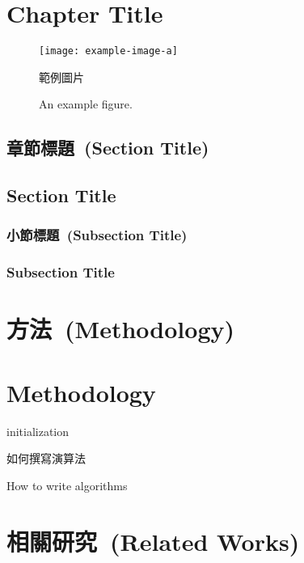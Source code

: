 \documentclass[master]{NTHUthesis}
\begin{document}
    \chapter{Chapter Title}
    \lipsum[1-3]
\fi

\begin{figure}
    \centering
    \texttt{[image: example-image-a]}
    \ifdefined \zhmode
        \caption{範例圖片}
    \else
        \caption{An example figure.}
    \fi
    \label{fig:example-a}
\end{figure}

\ifdefined \zhmode
    \section{章節標題~(Section Title)}
    \zhlipsum[4-5]
\else
    \section{Section Title}
    \lipsum[4-5]
\fi

\ifdefined \zhmode
    \subsection{小節標題~(Subsection Title)}
    \zhlipsum[6]
\else
    \subsection{Subsection Title}
    \lipsum[6]
\fi

\ifdefined \zhmode
    \chapter{方法~(Methodology)}
    \zhlipsum[1-3]
\else
    \chapter{Methodology}
    \lipsum[1-3]
\fi

\begin{algorithm}[t]
\SetAlgoLined
{}
 initialization\;
 \ifdefined \zhmode
    \caption{如何撰寫演算法}
 \else
    \caption{How to write algorithms}
 \fi
\end{algorithm}

\ifdefined \zhmode
    \chapter{相關研究~(Related Works)}
    
\end{document}
